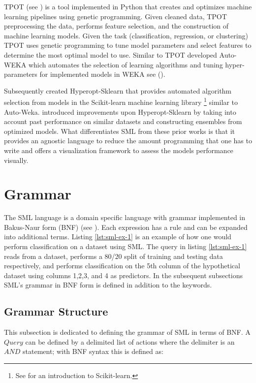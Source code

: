 TPOT (see \cite{TPOT}) is a tool implemented in Python that creates and optimizes machine learning pipelines using genetic programming.  Given cleaned data,  TPOT  preprocessing the data,  performs feature selection,  and the construction of machine learning models.  Given the task (classification,  regression,  or clustering) TPOT uses genetic programming to tune model parameters and select features to determine the most optimal model to use.  Similar to TPOT \cite{kotthoff_auto_2019} developed Auto-WEKA which automates the selection of learning algorithms and tuning hyper-parameters for implemented models in WEKA see (\cite{frank2005weka}).   

Subsequently \cite{komer_hyperopt_2019} created Hyperopt-Sklearn that provides automated algorithm selection from models in the Scikit-learn machine learning library \footnote{See \cite{scikit-learn} for an introduction to Scikit-learn.} similar to Auto-Weka.  \cite{feurer_auto_2018} introduced improvements upon Hyperopt-Sklearn by taking into account past performance on similar datasets and constructing ensembles from optimized models.  %
What differentiates SML from these prior works is that it provides an agnostic language to reduce the amount programming that one has to write and offers a visualization framework to assess the models performance visually.

\section{Grammar}
\label{grammar}

The SML language is a domain specific language with grammar implemented in Bakus-Naur form (BNF) (see \cite{Backus59}).  Each expression has a rule and can be expanded into additional terms.  Listing \ref{lst:sml-ex-1} is an example of how one would perform classification on a dataset using SML. The query in listing \ref{lst:sml-ex-1} reads from a dataset, performs a 80/20 split of training and testing data respectively, and performs classification on the 5th column of the hypothetical dataset using columns 1,2,3, and 4 as predictors. In the subsequent subsections SML's grammar in BNF form is defined in addition to the keywords.

\subsection{Grammar Structure}
This subsection is dedicated to defining the grammar of SML in terms of BNF.  A \(Query\) can be defined by a delimited list of actions where the delimiter is an \(AND\) statement; with BNF syntax this is defined as:

